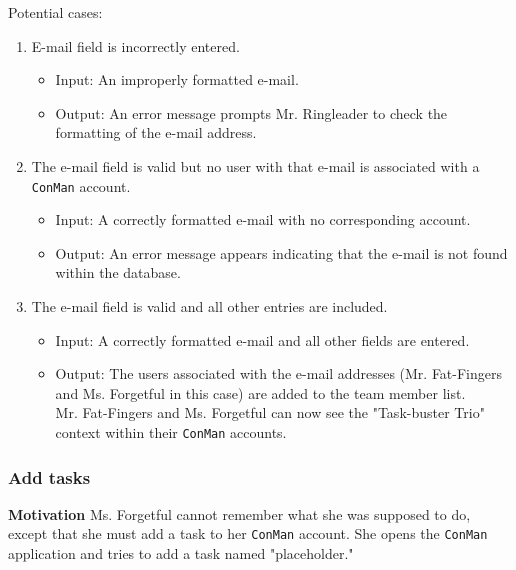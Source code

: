 \documentclass{article}
\begin{document}
Potential cases:
\begin{enumerate}
    \item E-mail field is incorrectly entered.
        \begin{itemize}
            \item Input: An improperly formatted e-mail.
            \item Output: An error message prompts Mr. Ringleader to check the formatting of the e-mail address.
        \end{itemize}
    \item The e-mail field is valid but no user with that e-mail is associated with a \texttt{ConMan} account.
        \begin{itemize}
            \item Input: A correctly formatted e-mail with no corresponding account.
            \item Output: An error message appears indicating that the e-mail is not found within the database.
        \end{itemize}
    \item The e-mail field is valid and all other entries are included.
        \begin{itemize}
            \item Input: A correctly formatted e-mail and all other fields are entered.
            \item Output: The users associated with the e-mail addresses (Mr. Fat-Fingers and Ms. Forgetful in this case) are added to the team member list.\\
                Mr. Fat-Fingers and Ms. Forgetful can now see the "Task-buster Trio" context within their \texttt{ConMan} accounts.
        \end{itemize}
\end{enumerate}

\subsubsection{Add tasks}
\textbf{Motivation} Ms. Forgetful cannot remember what she was supposed to do, except that she must add a task to her \texttt{ConMan} account.  
She opens the \texttt{ConMan} application and tries to add a task named "placeholder."
\end{document}
